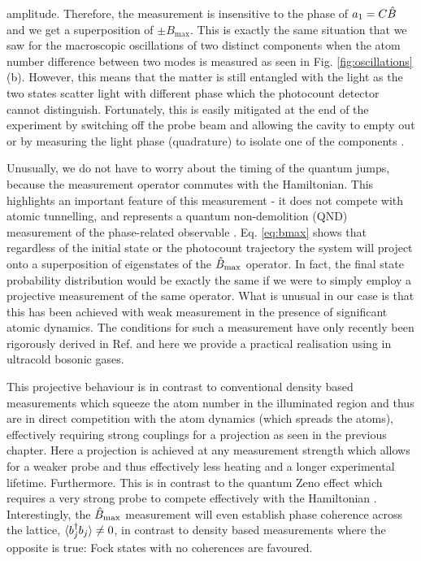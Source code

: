 amplitude. Therefore, the measurement is insensitive to the phase of
$a_1 = C \hat{B}$ and we get a superposition of $\pm B_\mathrm{max}$. This
is exactly the same situation that we saw for the macroscopic
oscillations of two distinct components when the atom number
difference between two modes is measured as seen in
Fig. \ref{fig:oscillations}(b). However, this means that the matter is
still entangled with the light as the two states scatter light with
different phase which the photocount detector cannot
distinguish. Fortunately, this is easily mitigated at the end of the
experiment by switching off the probe beam and allowing the cavity to
empty out or by measuring the light phase (quadrature) to isolate one
of the components \cite{mekhov2012, mekhov2009pra, atoms2015}.

Unusually, we do not have to worry about the timing of the quantum
jumps, because the measurement operator commutes with the
Hamiltonian. This highlights an important feature of this measurement
- it does not compete with atomic tunnelling, and represents a quantum
non-demolition (QND) measurement of the phase-related observable
\cite{brune1992}. Eq. \eqref{eq:bmax} shows that regardless of the
initial state or the photocount trajectory the system will project
onto a superposition of eigenstates of the $\hat{B}_\mathrm{max}$ operator. In fact,
the final state probability distribution would be exactly the same if
we were to simply employ a projective measurement of the same
operator. What is unusual in our case is that this has been achieved
with weak measurement in the presence of significant atomic
dynamics. The conditions for such a measurement have only recently
been rigorously derived in Ref. \cite{weinberg2016} and here we
provide a practical realisation using in ultracold bosonic gases.

This projective behaviour is in contrast to conventional density based
measurements which squeeze the atom number in the illuminated region
and thus are in direct competition with the atom dynamics (which
spreads the atoms), effectively requiring strong couplings for a
projection as seen in the previous chapter. Here a projection is
achieved at any measurement strength which allows for a weaker probe
and thus effectively less heating and a longer experimental
lifetime. Furthermore. This is in contrast to the quantum Zeno effect
which requires a very strong probe to compete effectively with the
Hamiltonian \cite{misra1977, facchi2008, raimond2010, raimond2012,
  signoles2014}. Interestingly, the $\hat{B}_\mathrm{max}$ measurement will even
establish phase coherence across the lattice,
$\langle b^\dagger_j b_j \rangle \ne 0$, in contrast to density based
measurements where the opposite is true: Fock states with no
coherences are favoured.


